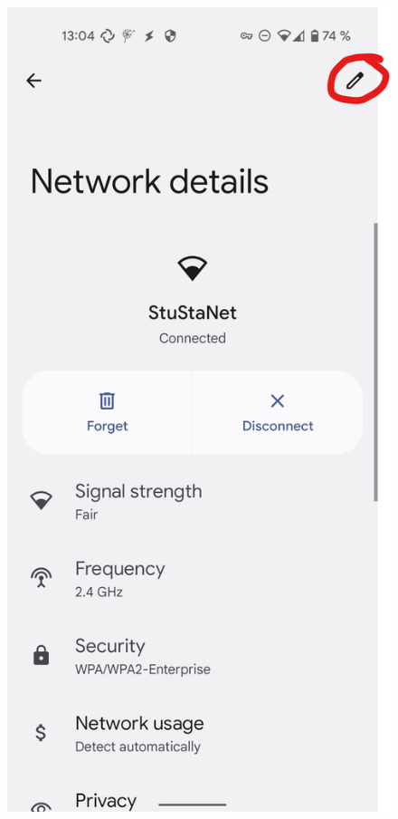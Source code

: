 \documentclass[a4paper,12pt]{scrartcl}
\begin{document}
\begin{figure}[h]
\begin{minipage}{0.24\textwidth}
		\includegraphics[width=0.7\linewidth,keepaspectratio]{Bilder/Android/android12_2}
	\end{minipage}
	\begin{minipage}{0.24\textwidth}

\end{minipage}
\end{figure}
\end{document}

